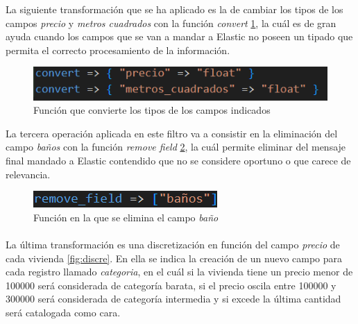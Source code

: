 La siguiente transformación que se ha aplicado es la de cambiar los tipos de los campos \textit{precio} y \textit{metros cuadrados} con la función \textit{convert} \ref{fig:convert}, la cuál es de gran ayuda cuando los campos que se van a mandar a Elastic no poseen un tipado que permita el correcto procesamiento de la información.

\begin{figure}
    \centering
    \includegraphics[width=1\linewidth]{img/convert.png}
    \caption{Función que convierte los tipos de los campos indicados}
    \label{fig:convert}
\end{figure}

La tercera operación aplicada en este filtro va a consistir en la eliminación del campo \textit{baños} con la función \textit{remove field} \ref{fig:remove}, la cuál permite eliminar del mensaje final mandado a Elastic contendido que no se considere oportuno o que carece de relevancia.

\begin{figure}
    \centering
    \includegraphics[width=1\linewidth]{img/remove.png}
    \caption{Función en la que se elimina el campo \textit{baño}}
    \label{fig:remove}
\end{figure}
\paragraph{}

La última transformación es una discretización en función del campo \textit{precio} de cada vivienda \ref{fig:discre}. En ella se indica la creación de un nuevo campo para cada registro llamado \textit{categoria}, en el cuál si la vivienda tiene un precio menor de 100000 será considerada de categoría barata, si el precio oscila entre 100000 y 300000 será considerada de categoría intermedia y si excede la última cantidad será catalogada como cara.

